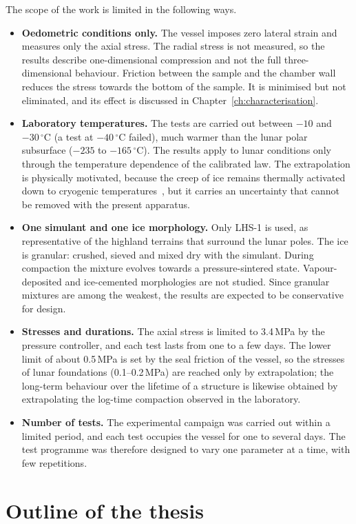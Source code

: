 The scope of the work is limited in the following ways.
\begin{itemize}
    \item \textbf{Oedometric conditions only.} The vessel imposes zero lateral strain and measures only the axial stress. The radial stress is not measured, so the results describe one-dimensional compression and not the full three-dimensional behaviour. Friction between the sample and the chamber wall reduces the stress towards the bottom of the sample. It is minimised but not eliminated, and its effect is discussed in Chapter~\ref{ch:characterisation}.
    \item \textbf{Laboratory temperatures.} The tests are carried out between $-10$ and $-30\,^\circ$C (a test at $-40\,^\circ$C failed), much warmer than the lunar polar subsurface ($-235$ to $-165\,^\circ$C). The results apply to lunar conditions only through the temperature dependence of the calibrated law. The extrapolation is physically motivated, because the creep of ice remains thermally activated down to cryogenic temperatures~\cite{durham1997}, but it carries an uncertainty that cannot be removed with the present apparatus.
    \item \textbf{One simulant and one ice morphology.} Only LHS-1 is used, as representative of the highland terrains that surround the lunar poles. The ice is granular: crushed, sieved and mixed dry with the simulant. During compaction the mixture evolves towards a pressure-sintered state. Vapour-deposited and ice-cemented morphologies are not studied. Since granular mixtures are among the weakest, the results are expected to be conservative for design.
    \item \textbf{Stresses and durations.} The axial stress is limited to 3.4\,MPa by the pressure controller, and each test lasts from one to a few days. The lower limit of about 0.5\,MPa is set by the seal friction of the vessel, so the stresses of lunar foundations (0.1--0.2\,MPa) are reached only by extrapolation; the long-term behaviour over the lifetime of a structure is likewise obtained by extrapolating the log-time compaction observed in the laboratory.
    \item \textbf{Number of tests.} The experimental campaign was carried out within a limited period, and each test occupies the vessel for one to several days. The test programme was therefore designed to vary one parameter at a time, with few repetitions.
\end{itemize}

\section*{Outline of the thesis}

